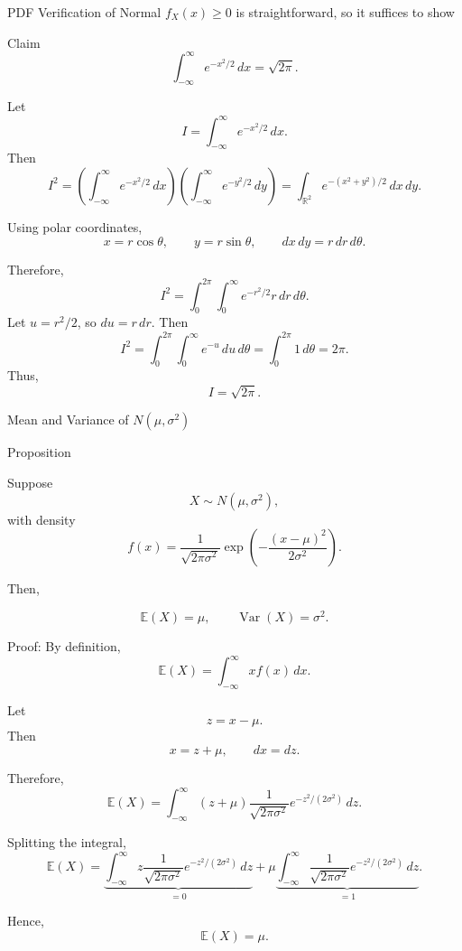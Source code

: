 \begin{frame}{PDF Verification of Normal}
\small
$f_X(x)\geq 0 $ is straightforward, so it suffices to show
\begin{keybox}{Claim} 
\[
\int_{-\infty}^{\infty} e^{-x^2/2}\,dx=\sqrt{2\pi}.
\]
\end{keybox}

Let
\[
I=\int_{-\infty}^{\infty}e^{-x^2/2}\,dx.
\]
Then
\[
I^2
=
\left(\int_{-\infty}^{\infty}e^{-x^2/2}\,dx\right)
\left(\int_{-\infty}^{\infty}e^{-y^2/2}\,dy\right)
=
\int_{\mathbb{R}^2}e^{-(x^2+y^2)/2}\,dx\,dy.
\]

Using polar coordinates,
\[
x=r\cos\theta,
\qquad
y=r\sin\theta,
\qquad
dx\,dy=r\,dr\,d\theta.
\]

Therefore,
\[
I^2
=
\int_0^{2\pi}\int_0^\infty e^{-r^2/2}r\,dr\,d\theta.
\]
Let \(u=r^2/2\), so \(du=r\,dr\). Then
\[
I^2
=
\int_0^{2\pi}\int_0^\infty e^{-u}\,du\,d\theta
=
\int_0^{2\pi}1\,d\theta
=
2\pi.
\]
Thus,
\[
{I=\sqrt{2\pi}}.
\]

\end{frame}






















\begin{frame}{Mean and Variance of \(N(\mu,\sigma^2)\)}

\begin{keybox}{Proposition}


Suppose
\[
X\sim N(\mu,\sigma^2),
\]
with density
\[
f(x)
=
\frac{1}{\sqrt{2\pi\sigma^2}}
\exp\left(
-\frac{(x-\mu)^2}{2\sigma^2}
\right).
\]

Then,

\[
\mathbb{E}(X)=\mu,
\qquad
\operatorname{Var}(X)=\sigma^2.
\]
\end{keybox}

\vspace{0.25cm}

Proof: By definition,
\[
\mathbb{E}(X)
=
\int_{-\infty}^{\infty}
x f(x)\,dx.
\]
\end{frame}


\begin{frame}{}
Let
\[
z=x-\mu.
\]
Then
\[
x=z+\mu,
\qquad
dx=dz.
\]

Therefore,
\[
\mathbb{E}(X)
=
\int_{-\infty}^{\infty}
(z+\mu)
\frac{1}{\sqrt{2\pi\sigma^2}}
e^{-z^2/(2\sigma^2)}
\,dz.
\]

Splitting the integral,
\[
\mathbb{E}(X)
=
\underbrace{
\int_{-\infty}^{\infty}
z
\frac{1}{\sqrt{2\pi\sigma^2}}
e^{-z^2/(2\sigma^2)}
\,dz
}_{=0}
+
\mu
\underbrace{
\int_{-\infty}^{\infty}
\frac{1}{\sqrt{2\pi\sigma^2}}
e^{-z^2/(2\sigma^2)}
\,dz
}_{=1}.
\]

Hence,
\[
{\mathbb{E}(X)=\mu.}
\]

\end{frame}







